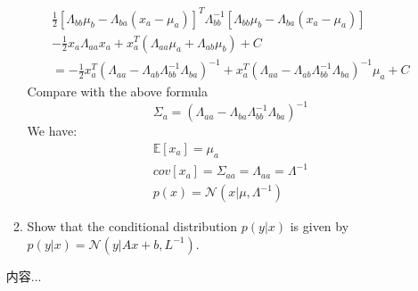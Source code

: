 \documentclass[a4paper]{article}
\begin{document}
\begin{enumerate}
\begin{enumerate}
\begin{solution}
\begin{equation*}
				\begin{split}
					\frac{1}{2}[\Lambda_{bb}\mu_b-\Lambda_{ba}(x_a-\mu_a)]^T\Lambda_{bb}^{-1}[\Lambda_{bb}\mu_b-\Lambda_{ba}(x_a-\mu_a)]\\
					-\frac{1}{2}x_a\Lambda_{aa}x_a+x_a^T(\Lambda_{aa}\mu_a+\Lambda_{ab}\mu_b)+C\\
					=-\frac{1}{2}x_a^T(\Lambda_{aa}-\Lambda_{ab}\Lambda_{bb}^{-1}\Lambda_{ba})^{-1}
					+x_a^T(\Lambda_{aa}-\Lambda_{ab}\Lambda_{bb}^{-1}\Lambda_{ba})^{-1}\mu_a+C
				\end{split}				
				\end{equation*}
				Compare with the above formula
				\begin{equation*}
					\Sigma_a=(\Lambda_{aa}-\Lambda_{ba}\Lambda_{bb}^{-1}\Lambda_{ba})^{-1}
				\end{equation*}
				We have:
				\begin{equation*}
				\begin{split}
					\mathbb{E}[x_a]=\mu_a\\
					cov[x_a] = \Sigma_{aa}=\Lambda_{aa}=\Lambda^{-1}\\
					p(x)=\mathcal{N}(x|\mu,\Lambda^{-1})
				\end{split}
				\end{equation*}
			\end{solution}
			\item
			Show that the conditional distribution $p(y|x)$ is given by $p(y|x)=\mathcal{N}(y|Ax + b,L^{-1})$.
		\end{enumerate}
		\begin{solution}
			内容...
		\end{solution}
		

\end{enumerate}
\end{document}
